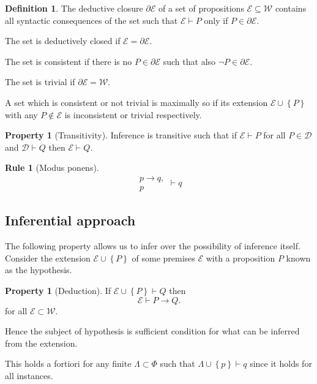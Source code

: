 \documentclass{amsbook}
\newcommand{\setsm}[1]{\left\{#1\right\}}
\newcommand{\wffs}{\mathcal W}
\newcommand{\infers}{\mathrel\vdash}
\newcommand{\then}{\mathrel\rightarrow}
\theoremstyle{definition}
\newtheorem{prop}{Property}[section]
\newtheorem{subprop}{Property}[subsection]
\newtheorem{frule}{Rule}[chapter]
\newtheorem{dfn}{Definition}[section]
\begin{document}
\begin{dfn}
    The deductive closure $\partial \mathcal E$ of a set of propositions $\mathcal E \subseteq \wffs$ contains all syntactic consequences of the set such that $\mathcal E \infers P$ only if $P \in \partial\mathcal E$.

    The set is deductively closed if $\mathcal E = \partial\mathcal E$.

    The set is consistent if there is no $P \in \partial\mathcal E$ such that also $\neg P \in \partial\mathcal E$.

    The set is trivial if $\partial\mathcal E = \wffs$.

    A set which is consistent or not trivial is maximally so if its extension $\mathcal E \cup \setsm P$ with any $P \notin \mathcal E$ is inconsistent or trivial respectively.
\end{dfn}

\begin{prop}[Transitivity]
    Inference is transitive such that if $\mathcal E \infers P$ for all $P \in \mathcal D$ and $\mathcal D \infers Q$ then $\mathcal E \infers Q$.
\end{prop}

\begin{frule}[Modus ponens]
    $$\begin{aligned}p \rightarrow q, \\ p\end{aligned} \infers q$$
\end{frule}

\subsection{Inferential approach}

The following property allows us to infer over the possibility of inference itself. Consider the extension $\mathcal E \cup\setsm P$ of some premises $\mathcal E$ with a proposition $P$ known as the hypothesis.

\begin{subprop}[Deduction]
    If $\mathcal E \cup\setsm P \infers Q$ then
    $$\mathcal E \infers P \then Q.$$
    for all $\mathcal E \subset \wffs$.
\end{subprop}

Hence the subject of hypothesis is sufficient condition for what can be inferred from the extension.

This holds a fortiori for any finite $\varLambda \subset \Phi$ such that $\varLambda \cup \setsm p \infers q$ since it holds for all instances.
\end{document}
